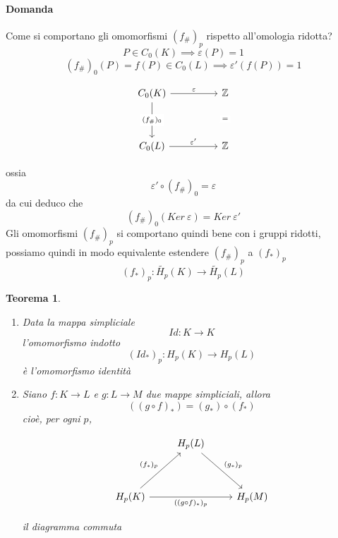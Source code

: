 \documentclass[a4paper]{report}
\newtheorem{theorem}{Teorema}
\newcommand{\Z}{\ensuremath{\mathbb{Z}}}
\newcommand{\ra}{\ensuremath{\rightarrow}}
\newcommand{\shrp}[1]{\ensuremath{({#1}_\#)_p}}
\newcommand{\str}[1]{\ensuremath{({#1}_*)_p}}
\begin{document}
\paragraph{Domanda} Come si comportano gli omomorfismi $(f_\#)_p$ rispetto all'omologia ridotta?
\[
    P\in C_0(K)\implies \varepsilon(P)=1
\]
\[
    (f_\#)_0(P)=f(P)\in C_0(L)\implies \varepsilon'(f(P))=1
\]
\begin{center}
    \[\begin{tikzcd}
            {C_0(K)} && \Z \\
            \\
            {C_0(L)} && \Z
            \arrow["\varepsilon", from=1-1, to=1-3]
            \arrow["{\varepsilon'}", from=3-1, to=3-3]
            \arrow["{(f_\#)_0}"{description}, from=1-1, to=3-1]
            \arrow["{=}"{description}, draw=none, from=1-3, to=3-3]
        \end{tikzcd}\]
\end{center}
ossia
\[
    \varepsilon'\circ(f_\#)_0=\varepsilon
\]
da cui deduco che
\[
    (f_\#)_0(Ker\ \varepsilon)=Ker\ \varepsilon'
\]
Gli omomorfismi \shrp{f} si comportano quindi bene con i gruppi ridotti, possiamo quindi in modo equivalente estendere \shrp{f} a \str{f}
\[
    \str{f}:\tilde{H_p}(K)\ra\tilde{H_p}(L)
\]
\begin{theorem}
    \begin{enumerate}
        \item Data la mappa simpliciale
              \[
                  Id:K\ra K
              \]
              l'omomorfismo indotto
              \[
                  (Id_*)_p:H_p(K)\ra H_p(L)
              \]
              è l'omomorfismo identità
        \item Siano $f:K\ra L$ e $g:L\ra M$ due mappe simpliciali, allora
              \[
                  ((g\circ f)_*)=(g_*)\circ(f_*)
              \]
              cioè, per ogni $p$,
              \begin{center}
                  \[\begin{tikzcd}
                          & {H_p(L)} \\
                          \\
                          {H_p(K)} && {H_p(M)}
                          \arrow["{(f_*)_p}", from=3-1, to=1-2]
                          \arrow["{(g_*)_p}", from=1-2, to=3-3]
                          \arrow["{((g\circ f)_*)_p}"', from=3-1, to=3-3]
                      \end{tikzcd}\]
              \end{center}
              il diagramma commuta
    \end{enumerate}
\end{theorem}
\end{document}
